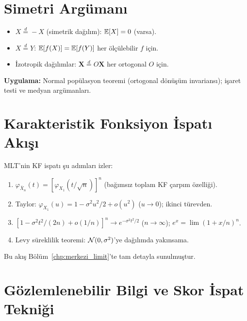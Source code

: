 \section{Simetri Argümanı}
\label{app:simetri}

\begin{itemize}
  \item $X\overset{d}{=}-X$ (simetrik dağılım): $\mathbb{E}[X]=0$ (varsa).
  \item $X\overset{d}{=}Y$: $\mathbb{E}[f(X)]=\mathbb{E}[f(Y)]$ her ölçülebilir $f$ için.
  \item İzotropik dağılımlar: $\mathbf{X}\overset{d}{=}O\mathbf{X}$ her ortogonal $O$ için.
\end{itemize}

\noindent\textbf{Uygulama:} Normal popülasyon teoremi (ortogonal dönüşüm invariansı); işaret testi ve medyan argümanları.

\section{Karakteristik Fonksiyon İspatı Akışı}
\label{app:kf_ispat_akisi}

MLT'nin KF ispatı şu adımları izler:
\begin{enumerate}
  \item $\varphi_{\bar{X}_n}(t) = [\varphi_{X_1}(t/\sqrt{n})]^n$ (bağımsız toplam KF çarpım özelliği).
  \item Taylor: $\varphi_{X_1}(u) = 1 - \sigma^2 u^2/2 + o(u^2)$ ($u\to0$); ikinci türevden.
  \item $[1-\sigma^2t^2/(2n)+o(1/n)]^n\to e^{-\sigma^2t^2/2}$ ($n\to\infty$); $e^x=\lim(1+x/n)^n$.
  \item Levy süreklilik teoremi: $\mathcal{N}(0,\sigma^2)$'ye dağılımda yakınsama.
\end{enumerate}

Bu akış Bölüm~\ref{chp:merkezi_limit}'te tam detayla sunulmuştur.

\section{Gözlemlenebilir Bilgi ve Skor İspat Tekniği}
\label{app:skor_teknik}

